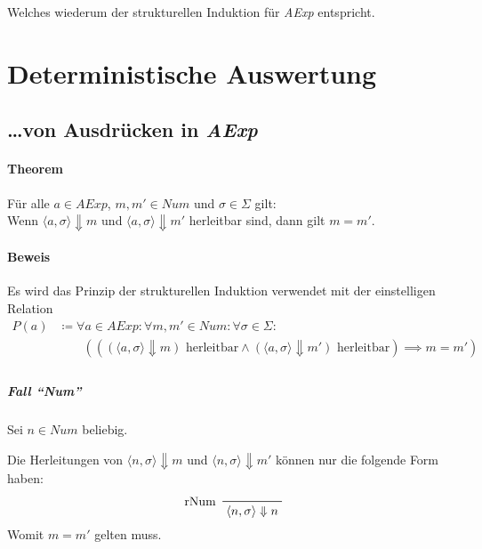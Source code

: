 																		Welches wiederum der strukturellen Induktion für \textit{AExp} entspricht.

													\section{Deterministische Auswertung}
														\subsection{\dots von Ausdrücken in \textit{AExp}}
															\paragraph{Theorem}
																Für alle $ a \in \textit{AExp} $, $ m, m' \in \textit{Num} $ und $ \sigma \in \Sigma $ gilt: \\
																Wenn $ \langle a, \sigma \rangle \Downarrow m $ und $ \langle a, \sigma \rangle \Downarrow m' $ herleitbar sind, dann gilt $ m = m' $.

															\paragraph{Beweis}
																Es wird das Prinzip der strukturellen Induktion verwendet mit der einstelligen Relation
																\begin{align*}
																	P(a) & \coloneqq \forall a \in \textit{AExp} : \forall m, m' \in \textit{Num} : \forall \sigma \in \Sigma :                                                          \\
																	     & \quad\quad (((\langle a, \sigma \rangle \Downarrow m) \text{ herleitbar} \land (\langle a, \sigma \rangle \Downarrow m') \text{ herleitbar}) \implies m = m') \\
																\end{align*}

																\subparagraph{Fall \enquote{Num}}
																	Sei $ n \in \textit{Num} $ beliebig.

																	Die Herleitungen von $ \langle n, \sigma \rangle \Downarrow m $ und $ \langle n, \sigma \rangle \Downarrow m' $ können nur die folgende Form haben:
																	\begin{equation*}
																		\prftree[l]
																		{ rNum }
																		{ \langle n, \sigma \rangle \Downarrow n }
																	\end{equation*}
																	Womit $ m = m' $ gelten muss.

